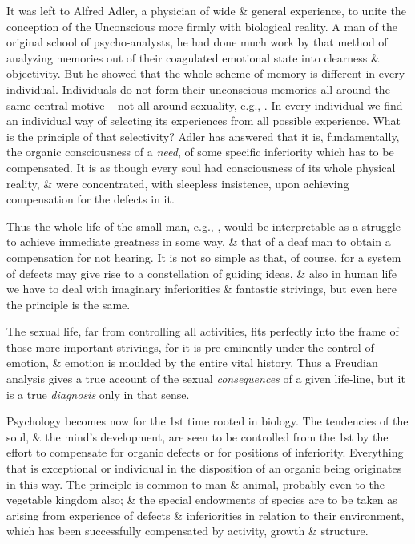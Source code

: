 \documentclass{article}
\begin{document}
It was left to Alfred Adler, a physician of wide \& general experience, to unite the conception of the Unconscious more firmly with biological reality. A man of the original school of psycho-analysts, he had done much work by that method of analyzing memories out of their coagulated emotional state into clearness \& objectivity. But he showed that the whole scheme of memory is different in every individual. Individuals do not form their unconscious memories all around the same central motive -- not all around sexuality, e.g., . In every individual we find an individual way of selecting its experiences from all possible experience. What is the principle of that selectivity? Adler has answered that it is, fundamentally, the organic consciousness of a \textit{need}, of some specific inferiority which has to be compensated. It is as though every soul had consciousness of its whole physical reality, \& were concentrated, with sleepless insistence, upon achieving compensation for the defects in it.

Thus the whole life of the small man, e.g., , would be interpretable as a struggle to achieve immediate greatness in some way, \& that of a deaf man to obtain a compensation for not hearing. It is not so simple as that, of course, for a system of defects may give rise to a constellation of guiding ideas, \& also in human life we have to deal with imaginary inferiorities \& fantastic strivings, but even here the principle is the same.

The sexual life, far from controlling all activities, fits perfectly into the frame of those more important strivings, for it is pre-eminently under the control of emotion, \& emotion is moulded by the entire vital history. Thus a Freudian analysis gives a true account of the sexual \textit{consequences} of a given life-line, but it is a true \textit{diagnosis} only in that sense.

Psychology becomes now for the 1st time rooted in biology. The tendencies of the soul, \& the mind's development, are seen to be controlled from the 1st by the effort to compensate for organic defects or for positions of inferiority. Everything that is exceptional or individual in the disposition of an organic being originates in this way. The principle is common to man \& animal, probably even to the vegetable kingdom also; \& the special endowments of species are to be taken as arising from experience of defects \& inferiorities in relation to their environment, which has been successfully compensated by activity, growth \& structure.
\end{document}
